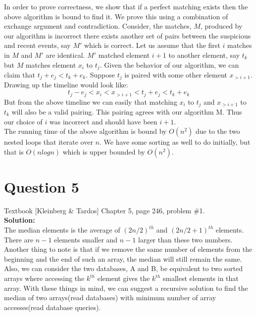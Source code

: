 \documentclass[11pt]{article}
\begin{document}
In order to prove correctness, we show that if a perfect matching exists then the above algorithm is bound to find it. We prove this using a combination of exchange argument and contradiction. Consider, the matches, $ M $, produced by our algorithm is incorrect there exists another set of pairs between the suspicious and recent events, say $ M' $ which is correct. Let us assume that the first $ i $ matches in $ M $ and $ M' $ are identical. $ M' $ matched element $ i+1 $ to another element, say $ t_k $ but $ M $ matches element $ x_i $ to $ t_j $. Given the behavior of our algorithm, we can claim that $ t_j+e_j < t_k+e_k $. Suppose $t_j$ is paired with some other element $ x_{>i+1} $. Drawing up the timeline would look like:
\begin{equation*}
t_j-e_j < x_i < x_{>i+1} < t_j+e_j < t_k+e_k
\end{equation*}
But from the above timeline we can easily that matching $ x_i $ to $ t_j $ and $ x_{>i+1} $ to $ t_k $ will also be a valid pairing. This pairing agrees with our algorithm M. Thus our choice of $ i $ was incorrect and should have been $ i+1 $. \\

The running time of the above algorithm is bound by $ O(n^2) $ due to the two nested loops that iterate over $ n $. We have some sorting as well to do initially, but that is $ O(nlogn) $ which is upper bounded by $ O(n^2) $.

\clearpage
\section{Question 5} Textbook [Kleinberg \& Tardos] Chapter 5, page 246, problem \#1. \\
\textbf{Solution:} \\

The median elements is the average of $ (2n/2)^{th} $ and $ (2n/2 + 1)^{th} $ elements. There are $ n-1 $ elements smaller and $ n-1 $ larger than these two numbers. Another thing to note is that if we remove the same number of elements from the beginning and the end of such an array, the median will still remain the same. Also, we can consider the two databases, A and B, be equivalent to two sorted arrays where accessing the $ k^{th} $ element gives the $ k^{th} $ smallest elements in that array. With these things in mind, we can suggest a recursive solution to find the median of two arrays(read databases) with minimum number of array accesses(read database queries). \\
\end{document}

